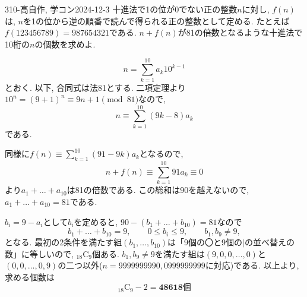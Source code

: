 \begin{prob}{310}{-高}{自作, 学コン2024-12-3}
十進法で1の位が0でない正の整数$n$に対し, $f(n)$は, $n$を1の位から逆の順番で読んで得られる正の整数として定める. たとえば$f(123456789) = 987654321$である. 
    $n+f(n)$が81の倍数となるような十進法で10桁の$n$の個数を求めよ. 
\end{prob}


\[n = \sum_{k=1}^{10} a_k 10^{k-1}\]
とおく. 以下, 合同式は法81とする. 二項定理より$10^n = (9 + 1)^n \equiv 9n + 1\pmod{81}$なので, 
\[
n\equiv \sum_{k=1}^{10}(9k-8)a_k
\]
である.





同様に$f(n) \equiv \sum_{k=1}^{10} (91-9k)a_k$となるので, 
\[
n + f(n) \equiv \sum_{k=1}^{10} 91 a_k \equiv 0
\]
より$a_1 + \dots + a_{10}$は81の倍数である. この総和は90を越えないので, $a_1 + \dots + a_{10} = 81$である. 

$b_i = 9-a_i$として$b_i$を定めると, $90 - (b_1 + \dots + b_{10}) = 81$なので 
\[
b_1 + \dots + b_{10} = 9,\qquad 0\leq b_i\leq 9,\qquad b_1,b_9\neq 9, 
\]
となる. 最初の2条件を満たす組$(b_1,\dots, b_{10})$は「9個の〇と9個の$|$の並べ替えの数」に等しいので, ${}_{18}\mathrm{C}_{9}$個ある. $b_1,b_9 \neq 9$を満たす組は$(9,0,0,\dots, 0)$と$(0,0,\dots,0,9)$の二つ以外($n = 9999999990, 0999999999$に対応)である. 以上より, 求める個数は
\[
{}_{18}\mathrm{C}_{9} - 2 = \boldsymbol{48618}\text{個}
\]
